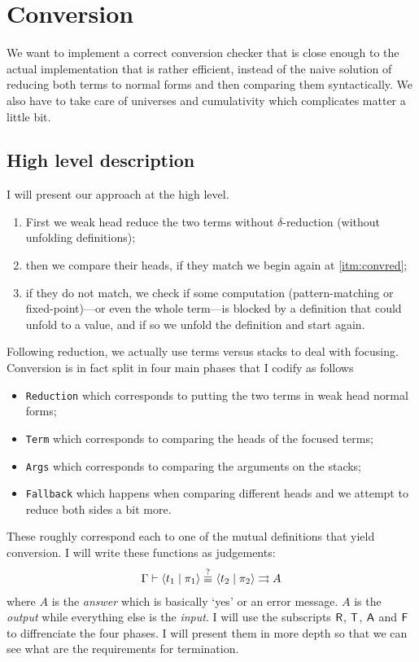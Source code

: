 \chapter{Conversion}

We want to implement a correct conversion checker that is close enough to the
actual implementation that is rather efficient, instead of the naive solution
of reducing both terms to normal forms and then comparing them syntactically.
We also have to take care of universes and cumulativity which complicates matter
a little bit.

\section{High level description}

I will present our approach at the high level.
\begin{enumerate}[label=(\arabic*)]
  \item \label{itm:convred} First we weak head reduce the two terms without
  \(\delta\)-reduction (\ie without unfolding definitions);
  \item then we compare their heads, if they match we begin again at
  \ref{itm:convred};
  \item if they do not match, we check if some computation (pattern-matching
  or fixed-point)---or even the whole term---is blocked by a definition that
  could unfold to a value, and if so we unfold the definition and start again.
\end{enumerate}

Following reduction, we actually use terms versus stacks to deal with focusing.
Conversion is in fact split in four main phases that I codify as follows
\begin{itemize}
  \item \texttt{Reduction} which corresponds to putting the two terms
  in weak head normal forms;
  \item \texttt{Term} which corresponds to comparing the heads of the
  focused terms;
  \item \texttt{Args} which corresponds to comparing the arguments
  on the stacks;
  \item \texttt{Fallback} which happens when comparing different heads
  and we attempt to reduce both sides a bit more.
\end{itemize}
These roughly correspond each to one of the mutual definitions that yield
conversion. I will write these functions as judgements:
\[
  \begin{array}{c}
    \Gamma \vdash \langle t_1 \mid \pi_1 \rangle \overset{?}{\equiv}_{} \langle t_2 \mid \pi_2 \rangle \rightrightarrows A
  \end{array}
\]
where \(A\) is the \emph{answer} which is basically `yes' or an error message.
\(A\) is the \emph{output} while everything else is the \emph{input}.
I will use the subscripts \(\mathsf{R}\), \(\mathsf{T}\), \(\mathsf{A}\) and \(\mathsf{F}\)
to diffrenciate the four phases.
I will present them in more depth so that we can see what are
the requirements for termination.

